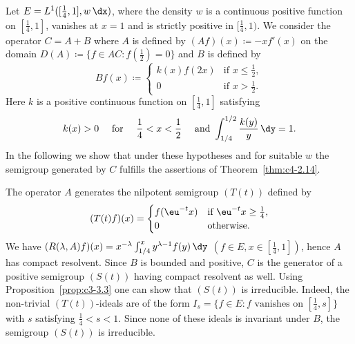 \begin{example}\label{ex:c4-2.15}
Let $E = L^{1}([\frac{1}{4},1],w\,\dx)$, where the density $w$ is a continuous positive function on $[\frac{1}{4},1]$, vanishes at $x = 1$ and is strictly positive in $[\frac{1}{4},1)$.
We consider the operator $C = A + B$ where $A$ is defined by $(Af)(x) \coloneq  -xf'(x)$ on the domain $D(A) \coloneqq \{f \in AC \colon f(\frac{1}{2}) = 0\}$ and $B$ is defined by
\begin{equation*}\label{eq:c4-2.12-kgk}
Bf(x) \coloneqq \begin{cases}
    k(x)f(2x) & \text{if } x \leq \frac{1}{2}, \\
    0 & \text{if } x > \frac{1}{2}.
\end{cases}
\end{equation*}
Here $k$ is a positive continuous function on $[\frac{1}{4},1]$ satisfying
\begin{equation}\label{eq:c4-2.13}
k(x) > 0 \quad \text{ for } \quad \frac{1}{4} < x < \frac{1}{2} \quad \text{ and }  \int_{1/4}^{1/2} \frac{k(y)}{y} \, \dy = 1.
\end{equation}
In the following we show that under these hypotheses and for suitable $w$ the semigroup generated by $C$ fulfills the assertions of Theorem~\ref{thm:c4-2.14}.

The operator $A$ generates the nilpotent semigroup $(T(t))$ defined by
\begin{equation*}\label{eq:c4-2.13-kgk}
(T(t)f)(x) = \begin{cases}
    f(\eu^{-t}x) & \text{if } \eu^{-t}x \geq \frac{1}{4}, \\
    0 & \text{otherwise}.
\end{cases}
\end{equation*}
We have $(R(\lambda,A)f)(x) = x^{-\lambda}\int_{1/4}^{x} y^{\lambda-1}f(y) \, \dy$ $(f \in E, x \in [\frac{1}{4},1])$, hence $A$ has compact resolvent.
Since $B$ is bounded and positive, $C$ is the generator of a positive semigroup $(S(t))$ having compact resolvent as well.
Using Proposition~\ref{prop:c3-3.3}  one can show that $(S(t))$ is irreducible.
Indeed, the non-trivial $(T(t))$-ideals are of the form $I_{s} = \{f \in E \colon f \text{ vanishes on } [\frac{1}{4},s]\}$ with $s$ satisfying $\frac{1}{4} < s < 1$.
Since none of these ideals is invariant under $B$, the semigroup $(S(t))$ is irreducible.


\end{example}
